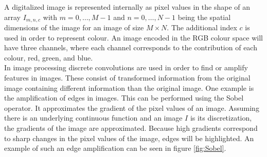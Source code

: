 A digitalized image is represented internally as pixel values in the shape of an array $I_{m,n,c}$ with $m=0,\dots ,M-1$ and $n=0,\dots ,N-1$ being the spatial dimensions of the image for an image of size $M\times N$. The additional index $c$ is used in order to represent colour. An image encoded in the RGB colour space will have three channels, where each channel corresponds to the contribution of each colour, red, green, and blue. \\

In image processing discrete convolutions are used in order to find or amplify features in images. These consist of transformed information from the original image containing different information than the original image. One example is the amplification of edges in images. This can be performed using the Sobel operator. It approximates the gradient of the pixel values of an image. Assuming there is an underlying continuous function and an image $I$ is its discretization, the gradients of the image are approximated. Because high gradients correspond to sharp changes in the pixel values of the image, edges will be highlighted. An example of such an edge amplification can be seen in figure \ref{fig:Sobel}.


